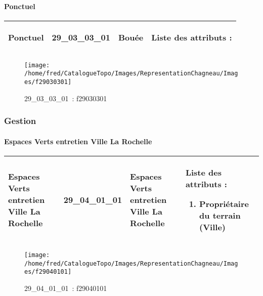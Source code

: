 \documentclass[12pt,titlepage]{book}
\begin{document}
\paragraph{Ponctuel}
\noindent
\vspace{\baselineskip}

\renewcommand{\arraystretch}{1.2}
\begin{supertabular}{|p{10cm}|c|p{13cm}|p{12cm}|}
 Ponctuel & 29\_03\_03\_01 & Bouée & Liste des attributs :
\begin{enumerate}
\end{enumerate}
\\
\hline
\end{supertabular}
\begin{figure}[h!]
  \hfill         %
  \begin{minipage}[t]{3cm}
    \begin{center}
      \texttt{[image: /home/fred/CatalogueTopo/Images/RepresentationChagneau/Images/f29030301]}
      \caption[~29\_03\_03\_01]{\small{29\_03\_03\_01~:} \tiny{f29030301}}\label{f29030301}
    \end{center}
  \end{minipage}
\end{figure}

\subsubsection{\large Gestion}
\paragraph{Espaces Verts entretien Ville La Rochelle}
\noindent
\vspace{\baselineskip}

\renewcommand{\arraystretch}{1.2}
\begin{supertabular}{|p{10cm}|c|p{13cm}|p{12cm}|}
 Espaces Verts entretien Ville La Rochelle & 29\_04\_01\_01 & Espaces Verts entretien Ville La Rochelle & Liste des attributs :
\begin{enumerate}
  \item Propriétaire du terrain (Ville)\end{enumerate}
\\
\hline
\end{supertabular}
\begin{figure}[h!]
  \hfill         %
  \begin{minipage}[t]{3cm}
    \begin{center}
      \texttt{[image: /home/fred/CatalogueTopo/Images/RepresentationChagneau/Images/f29040101]}
      \caption[~29\_04\_01\_01]{\small{29\_04\_01\_01~:} \tiny{f29040101}}\label{f29040101}
    \end{center}
  \end{minipage}
\end{figure}
\end{document}

